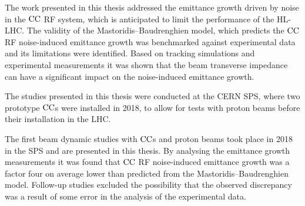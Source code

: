 
The work presented in this thesis addressed the emittance growth driven by noise in the ${\mathrm{CC}}$ RF system, which is anticipated to limit the performance of the HL-LHC. The validity of the Mastoridis--Baudrenghien model, which predicts the ${\mathrm{CC}}$ RF noise-induced emittance growth was benchmarked against experimental data and its limitations were identified. Based on tracking simulations and experimental measurements it was shown that the beam transverse impedance can have a significant impact on the noise-induced emittance growth. 

The studies presented in this thesis were conducted at the CERN SPS, where two prototype ${\mathrm{CC}}$s were installed in 2018, to allow for tests with proton beams before their installation in the LHC.

The first beam dynamic studies with ${\mathrm{CC}}$s and proton beams took place in 2018 in the SPS and are presented in this thesis. By analysing the emittance growth measurements it was found that ${\mathrm{CC}}$ RF noise-induced emittance growth was a factor four on average lower than predicted from the Mastoridis--Baudrenghien model. Follow-up studies excluded the possibility that the observed discrepancy was a result of some error in the analysis of the experimental data.




